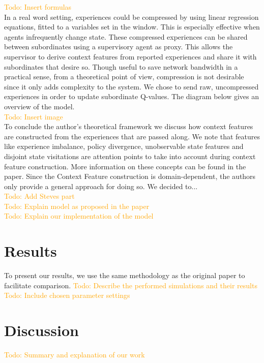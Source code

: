 \documentclass[letterpaper]{article}
\newcommand\todo[1]{\textcolor{orange}{Todo: #1}}
\begin{document}
\todo{Insert formulas}\\
In a real word setting, experiences could be compressed by using linear regression equations, fitted to a variables set in the window. This is especially effective when agents infrequently change state. These compressed experiences can be shared between subordinates using a supervisory agent as proxy. This allows the supervisor to derive context features from reported experiences and share it with subordinates that desire so. Though useful to save network bandwidth in a practical sense, from a theoretical point of view, compression is not desirable since it only adds complexity to the system. We chose to send raw, uncompressed experiences in order to update subordinate Q-values. The diagram below gives an overview of the model.\\
\todo{Insert image}\\
To conclude the author’s theoretical framework we discuss how context features are constructed from the experiences that are passed along. We note that features like experience imbalance, policy divergence, unobservable state features and disjoint state visitations are attention points to take into account during context feature construction. More information on these concepts can be found in the paper. Since the Context Feature construction is domain-dependent, the authors only provide a general approach for doing so. We decided to...\\
\todo{Add Steves part}
\\\todo{Explain model as proposed in the paper}
\\\todo{Explain our implementation of the model}

\section{Results}
To present our results, we use the same methodology as the original paper to facilitate comparison. 
\todo{Describe the performed simulations and their results}
\\\todo{Include chosen parameter settings}

\section{Discussion}
\todo{Summary and explanation of our work}
\end{document}
